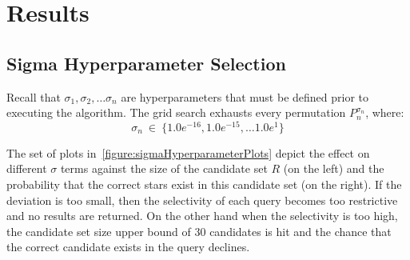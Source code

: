 \section{Results}\label{sec:results}

\subsection{Sigma Hyperparameter Selection}\label{subsec:sigmaHyperparameterSelectionResults}
Recall that $\sigma_1, \sigma_2, \ldots \sigma_n$ are hyperparameters that must be defined prior to executing the
algorithm.
The grid search exhausts every permutation $P_n^{\sigma_n}$, where:
\begin{equation}
    \label{eq:gridSearchQuerySigma}
    \sigma_n \ \in \ \{1.0e^{-16}, 1.0e^{-15}, \ldots 1.0e^{1}\}
\end{equation}

\begin{figure}
\end{figure}

The set of plots in~\autoref{figure:sigmaHyperparameterPlots} depict the effect on different $\sigma$ terms against the
size of the candidate set $R$ (on the left) and the probability that the correct stars exist in this candidate set (on
the right).
If the deviation is too small, then the selectivity of each query becomes too restrictive and no results are returned.
On the other hand when the selectivity is too high, the candidate set size upper bound of 30 candidates is
hit and the chance that the correct candidate exists in the query declines.

